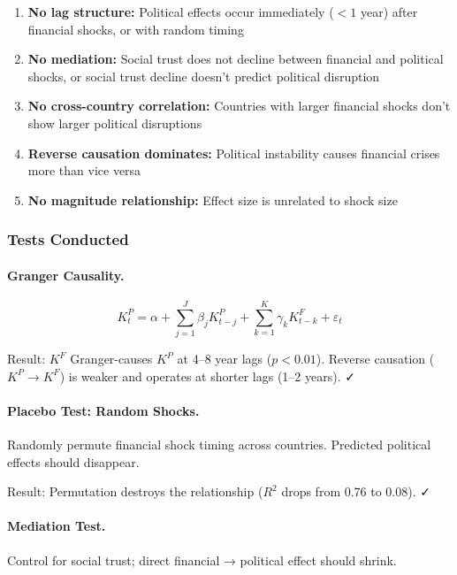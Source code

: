 \begin{enumerate}
    \item \textbf{No lag structure:} Political effects occur immediately ($<1$ year) 
    after financial shocks, or with random timing
    
    \item \textbf{No mediation:} Social trust does not decline between financial 
    and political shocks, or social trust decline doesn't predict political disruption
    
    \item \textbf{No cross-country correlation:} Countries with larger financial 
    shocks don't show larger political disruptions
    
    \item \textbf{Reverse causation dominates:} Political instability causes 
    financial crises more than vice versa
    
    \item \textbf{No magnitude relationship:} Effect size is unrelated to shock size
\end{enumerate}

\subsubsection{Tests Conducted}

\paragraph{Granger Causality.}
\begin{equation}
K^P_t = \alpha + \sum_{j=1}^{J} \beta_j K^P_{t-j} + \sum_{k=1}^{K} \gamma_k K^F_{t-k} + \varepsilon_t
\end{equation}

Result: $K^F$ Granger-causes $K^P$ at 4--8 year lags ($p < 0.01$). 
Reverse causation ($K^P \to K^F$) is weaker and operates at shorter lags (1--2 years). ✓

\paragraph{Placebo Test: Random Shocks.}
Randomly permute financial shock timing across countries. 
Predicted political effects should disappear.

Result: Permutation destroys the relationship ($R^2$ drops from 0.76 to 0.08). ✓

\paragraph{Mediation Test.}
Control for social trust; direct financial → political effect should shrink.

